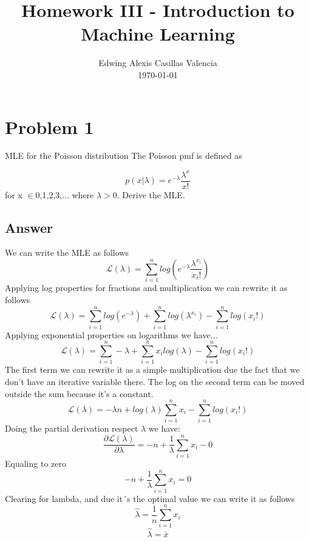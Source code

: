 \documentclass[conference, onecolumn]{IEEEtran}
\author{Edwing Alexis Casillas Valencia\\
	\today}
\title{Homework III - Introduction to Machine Learning}
\begin{document}
	
	\maketitle
	\thispagestyle{empty}
	
	\begin{abstract}
		
	\end{abstract}
	
	\section*{Problem 1}
	MLE for the Poisson distribution
	\newline
	The Poisson pmf is defined as
	
	\begin{equation}
		p(x|\lambda) = e^{-\lambda}\frac{\lambda^x}{x!}
	\end{equation}
	for x $\in${0,1,2,3,...} where $\lambda > 0$. Derive the MLE.
	
	\subsection*{Answer}
	We can write the MLE as follows
	\begin{equation}
		\mathcal{L}(\lambda) = \sum_{i=1}^{n} log(e^{-\lambda}\frac{\lambda^{x_i}}{x_i!})
	\end{equation}
	Applying log properties for fractions and multiplication we can rewrite it as follows
	\begin{equation}
		\mathcal{L}(\lambda) = \sum_{i=1}^{n} log(e^{-\lambda}) + \sum_{i=1}^{n}log(\lambda^{x_i}) - \sum_{i=1}^{n}log(x_i!)
	\end{equation}
	Applying exponential properties on logarithms we have...
	\begin{equation}
		\mathcal{L}(\lambda) = \sum_{i=1}^{n}-\lambda + \sum_{i=1}^{n}x_ilog(\lambda) - \sum_{i=1}^{n}log(x_i!)
	\end{equation}
	The first term we can rewrite it as a simple multiplication due the fact that we don't have an iterative variable there. The log on the second term can be moved outside the sum because it's a constant.
	\begin{equation}
		\mathcal{L}(\lambda) = -\lambda n + log(\lambda)\sum_{i=1}^{n}x_i - \sum_{i=1}^{n}log(x_i!)
	\end{equation}
	Doing the partial derivation respect $\lambda$ we have:
	\begin{equation}
		\frac{\partial \mathcal{L}(\lambda)}{\partial \lambda} = -n + \frac{1}{\lambda} \sum_{i=1}^{n} x_i - 0
	\end{equation}
	Equaling to zero
	\begin{equation}
		-n + \frac{1}{\lambda} \sum_{i=1}^{n} x_i = 0
	\end{equation}
	Clearing for lambda, and due it´s the optimal value we can write it as follows
	\begin{equation}
		\hat{\lambda} = \frac{1}{n} \sum_{i=1}^{n} x_i
	\end{equation}
	\begin{equation}
		\hat{\lambda} = \bar{x}
	\end{equation}
	
\end{document}
